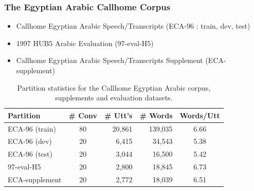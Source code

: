 \documentclass{beamer}
\begin{document}

\begin{frame}
\frametitle{The Egyptian Arabic Callhome Corpus}
\begin{itemize}
	\item Callhome Egyptian Arabic Speech/Transcripts (ECA-96 : train, dev, test)
	\item 1997 HUB5 Arabic Evaluation (97-eval-H5)
	\item Callhome Egyptian Arabic Speech/Transcripts Supplement (ECA-supplement)
\end{itemize}

\begin{table}
	\begin{center}
 	\begin{tabular}{| l | c | r | r | c |}
 	\hline
   	\textbf{Partition} & \textbf{\# Conv } & \textbf{\# Utt's } & \textbf{\# Words} & \textbf{Words/Utt} \\ \hline
   	ECA-96 (train) & 80 &20,861 & 139,035 & 6.66\\
   	\hline
   	ECA-96 (dev) & 20 & 6,415 & 34,543 & 5.38\\
   	\hline
   	ECA-96 (test) & 20 & 3,044 & 16,500 & 5.42\\
   	\hline
   	97-eval-H5 & 20 & 2,800 & 18,845 & 6.73\\
   	\hline
   	ECA-supplement & 20 & 2,772 & 18,039 & 6.51\\
   	\hline
 	\end{tabular}
 	\caption{Partition statistics for the Callhome Egyptian Arabic corpus, supplements and evaluation datasets.}
 	\label{tab:partition-stat}
 	\end{center}
\end{table}

\end{frame}

\end{document}

